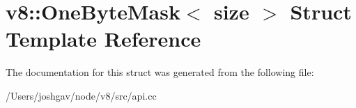 \hypertarget{structv8_1_1_one_byte_mask}{}\section{v8\+:\+:One\+Byte\+Mask$<$ size $>$ Struct Template Reference}
\label{structv8_1_1_one_byte_mask}


The documentation for this struct was generated from the following file\+:\begin{DoxyCompactItemize}
\item 
/\+Users/joshgav/node/v8/src/api.\+cc\end{DoxyCompactItemize}
